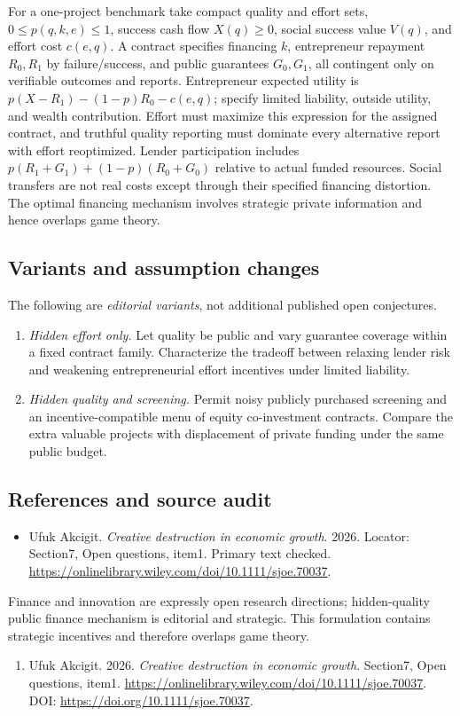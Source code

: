 \documentclass[11pt,a4paper]{article}
\begin{document}
For a one-project benchmark take compact quality and effort sets, \(0\le p(q,k,e)\le1\), success cash flow \(X(q)\ge0\), social success value \(V(q)\), and effort cost \(c(e,q)\). A contract specifies financing \(k\), entrepreneur repayment \(R_0,R_1\) by failure/success, and public guarantees \(G_0,G_1\), all contingent only on verifiable outcomes and reports. Entrepreneur expected utility is \(p(X-R_1)-(1-p)R_0-c(e,q)\); specify limited liability, outside utility, and wealth contribution. Effort must maximize this expression for the assigned contract, and truthful quality reporting must dominate every alternative report with effort reoptimized. Lender participation includes \(p(R_1+G_1)+(1-p)(R_0+G_0)\) relative to actual funded resources. Social transfers are not real costs except through their specified financing distortion. The optimal financing mechanism involves strategic private information and hence overlaps game theory.
\subsection*{Variants and assumption changes}
The following are \emph{editorial variants}, not additional published open conjectures.
\begin{enumerate}
\item \emph{Hidden effort only.} Let quality be public and vary guarantee coverage within a fixed contract family. Characterize the tradeoff between relaxing lender risk and weakening entrepreneurial effort incentives under limited liability.
\item \emph{Hidden quality and screening.} Permit noisy publicly purchased screening and an incentive-compatible menu of equity co-investment contracts. Compare the extra valuable projects with displacement of private funding under the same public budget.
\end{enumerate}
\subsection*{References and source audit}
\begin{itemize}
\item Ufuk Akcigit. \emph{Creative destruction in economic growth}. 2026. Locator: Section7, Open questions, item1. Primary text checked. \url{https://onlinelibrary.wiley.com/doi/10.1111/sjoe.70037}.
\end{itemize}
Finance and innovation are expressly open research directions; hidden-quality public finance mechanism is editorial and strategic. This formulation contains strategic incentives and therefore overlaps game theory.
\begin{enumerate}\raggedright
\item\hypertarget{definitions:source:30007548:1}{} Ufuk Akcigit. 2026. \emph{Creative destruction in economic growth}. Section7, Open questions, item1.
\url{https://onlinelibrary.wiley.com/doi/10.1111/sjoe.70037}.
DOI: \url{https://doi.org/10.1111/sjoe.70037}.
\end{enumerate}
\end{document}
